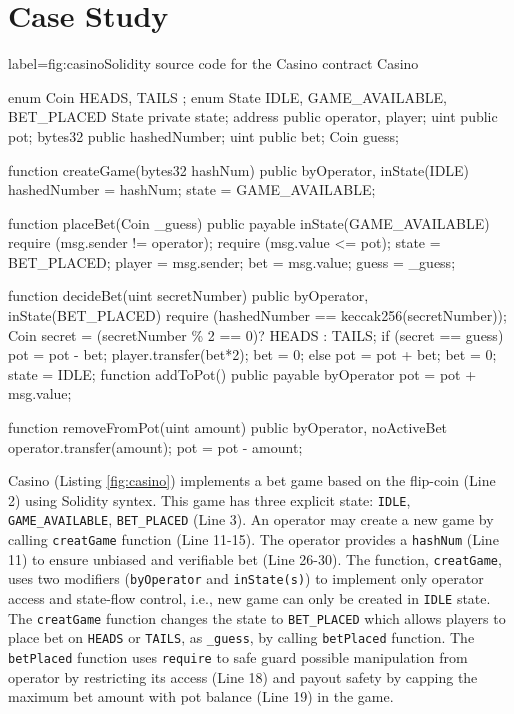 \documentclass[a4paper,UKenglish,cleveref, autoref, thm-restate]{oasics-v2021}
\begin{document}
\section{Case Study}
\begin{solidity}{label={fig:casino}}{Solidity source code for the Casino}
	contract Casino {
		enum Coin { HEADS, TAILS } ;
		enum State { IDLE, GAME_AVAILABLE,  BET_PLACED }
		State private state; 
		address public operator, player;
		uint public pot;
		bytes32 public hashedNumber;
		uint public bet;
		Coin guess;

		function createGame(bytes32 hashNum) 
			public byOperator, inState(IDLE) { 
			hashedNumber = hashNum; 
			state = GAME_AVAILABLE;
		}

		function placeBet(Coin _guess) public payable inState(GAME_AVAILABLE) {
			require (msg.sender != operator);
			require (msg.value <= pot);
			state = BET_PLACED; 
			player = msg.sender; 
			bet = msg.value; 
			guess = _guess; 
		}

 		function decideBet(uint secretNumber) 
		public byOperator, inState(BET_PLACED) { 
			require (hashedNumber == keccak256(secretNumber)); 
			Coin secret = (secretNumber \% 2 == 0)? HEADS : TAILS;
			if (secret == guess) {
				pot = pot - bet;  
				player.transfer(bet*2);  bet = 0;} 
			else {
				pot = pot + bet; bet = 0;
				}
			state = IDLE;}
		function addToPot() public payable byOperator { pot = pot + msg.value;}

		function removeFromPot(uint amount) public byOperator, noActiveBet { 
			operator.transfer(amount);  
			pot = pot - amount;}
		}
\end{solidity}
Casino (Listing \ref{fig:casino}) implements a bet game based on the flip-coin (Line 2) using Solidity syntex. 
%
This game has three explicit state: \texttt{IDLE}, \texttt{GAME\_AVAILABLE}, \texttt{BET\_PLACED} (Line 3).
%
An operator may create a new game by calling \texttt{creatGame} function (Line 11-15).
%
The operator provides a \texttt{hashNum} (Line 11) to ensure unbiased and verifiable bet (Line 26-30).
%
The function,  \texttt{creatGame}, uses two modifiers (\texttt{byOperator} and \texttt{inState(s)}) to implement only operator access and state-flow control, i.e., new game can only be created in \texttt{IDLE} state.
%
The \texttt{creatGame} function  changes the state to \texttt{BET\_PLACED} which allows players to place bet on \texttt{HEADS} or \texttt{TAILS}, as \texttt{\_guess}, by calling \texttt{betPlaced} function.
%
The \texttt{betPlaced} function uses \texttt{require} to safe guard possible manipulation from operator by restricting its access (Line 18) and payout safety by capping the maximum bet amount with pot balance (Line 19) in the game.
%
\end{document}
